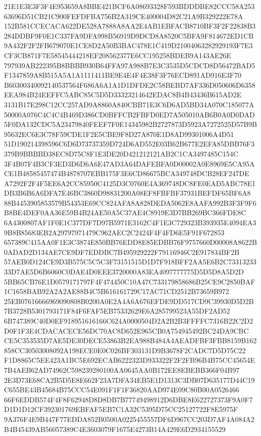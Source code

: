 \documentclass[UTF8,fontset=fandol,zihao=-4,a4paper]{ctexart}
\begin{document}
{{21E1E3E3F3F4E953659A8BBE421BCF6A08693328F593BDDDBE82CCC58A25363696D51CB21C900FEFDFBA756B2A319CE400004D82C21A9B329222E78A
152B581CCECACA622DE528A7888A8AA2E4AB1EBFACB8710BF3F2F22838B3284DDBF9F0E1C337FA9DFA998B56919D9DCD8A8520C5BFA9F814672ED1CB
9A432F2F2FB679070E1CE8D2A50B3BAC478E1C419D21004063282929193F7E3CF3CB871F7E58545444218EF208562377E6CC195258BDEB9A143AE26E
797939AB222395B8BBBB930B64FFA97A988B7E3C3535D5CDCD8D56472BAD5F1347859A8B515A5A1A1111411BE9E4E4F4E38F3F76ECD891AD916E3F70
B60300340092140537564F686A6A1A1D1DFDE2C58BEBD7AF336D050606D6358EEA984B24EEFFC5ABC85C5D5D33323214642EDAC8B4B43436B615AD2E
3131B17E298C12CC257AD9A8860A840CBB71E3C6D6AD5BD34A070C185077A50000A076C4C4C4B469D386CD0BFFCB2FBFD0ED7A505010AB6B0A0D0DAD
5F0DA132CDC5A23479840FEEF7F0E14345982B2727873D5923A7272525D57B9B95632EC6E3C78F59CDE1F2E5CBE9F8D27A870E1D8AD99301006A4D51
51D190214398596C6D6D73737359D724D6AD552E03B62B677E2EFA85DBB76F3379B9BBBBD38EC8D75C8F1E3DE20D421212121AB2C1CA3497485C154C
3F4B07F4B3CF3ED3D6D6A6E47AD3A64DAFEBFA0D00002A0E8969E5CA95ACE1B48585457474B4878707EBB175F3E6CD86675BCA349748DCB28EF247DE
A7292F2F4F5EE6A2CC85950C4125D3C0760E4A369748DC8FE0EAD5ABC78E1DB3B6B6A6DFA7E46BC3860D98831200A08EF8FBFBF37931BEFDF65BF6A8
88B4453905853579B54353E69CC824AFA8A828DEDA5062E8AAFA992B3F3F9F6B8BE4DEF0AA36E59B4B24AE50A5C37AE4C8919E3D7BB269BC366FDE8C
6A4300807AF1F0E1C377DF7D97B5971E3162C4F1E3C729323B393935E4094EA39B8B85683EB2A29797971479C962AEC2C2424F4F4FD6E5F91F672853
657389C415AA0F1E3C3874E850BB76EDD8E85EDBB76F9757660D00008A8622B0ADAD2D134AE7CE9DF7EDDBC7B495929222F79116946C2E917834BF2B
57AEB0D124CE9D3B575C5C5C3F73151515D1D7F918BFF2AA5E6B2C7331323333D7AE5D6B6060C0DAE4D0EEE3720000A83EA4097777775D5D5D8A5D2D
5BB65CB76E1D0579171797F4F474450C10A47C733179858686B25CE9C2850BAF1C1658BAB92A2A2AE88B4C5B616161729C17AC71CD2512B73659B972
25EB07616666969090808B0200A0E2A4A6A676EFDE9DD517CD9C39930D5D2B7B3728B5301793171F84F6FAF5EB75332629E6A285799523A55DF2AD52
6B747389C40D0EF918951616166C624A0000504D2A2B2B3FFFFC7316B22C2D2D0F1F3E4CDACACECE56DC70AC8D652E965CB0A754945492BC24DA9CBC
CE5C353535D7AE5DE30DECE53863B2EA988B484A4AEADFBF3FBB8159B162858CC30503008092A198ECE0E0C026BF303131D9B3678F2CADC7D5D75C22
F1D8865C5EE423A1BC5E692ECAB6222323D933322F2F2FB96B4B75CC45654E7B4AEB62AD74962C598239280100AA0645AA0B172EE8EBEBB366F04B97
2E3D73E68CA2B5D5E8E662F23A7DFA34EB5E1D1313C3DB07D635177D44C19C655BE43B45684B75CCC54E091F1F1F36820AAD974E09C80B00A0526466
66F6EDDB574F4F8F62948D8D8DB7B77749498912D6DBE8E622727373F9A0F7D1D1D12CF392301769EBFAF5EB7C1A32C5395D75CC25127722F8E5975F
9A376F4E9B447F77EDDA852B0500A0225455557DF6D967CC203D7AF4A084A2B4B45439AB56057389C4E3603079F1675E4273B14A429E6D2934155529
}}
\end{document}
